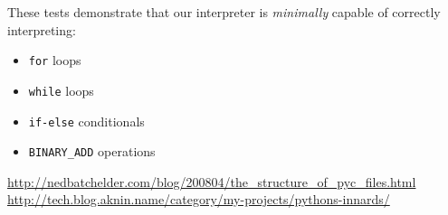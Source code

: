 \documentclass{article}
\begin{document}
These tests demonstrate that our interpreter is \textit{minimally} capable of correctly interpreting:
\begin{itemize}
\item \texttt{for} loops
\item \texttt{while} loops
\item \texttt{if-else} conditionals
\item \texttt{BINARY_ADD} operations
\end{itemize}

\vspace{0.5cm}
\begin{footnotesize}
\begin{thebibliography}{}

\url{http://nedbatchelder.com/blog/200804/the_structure_of_pyc_files.html}
\url{http://tech.blog.aknin.name/category/my-projects/pythons-innards/}
\end{thebibliography}
\end{footnotesize}
\end{document}
